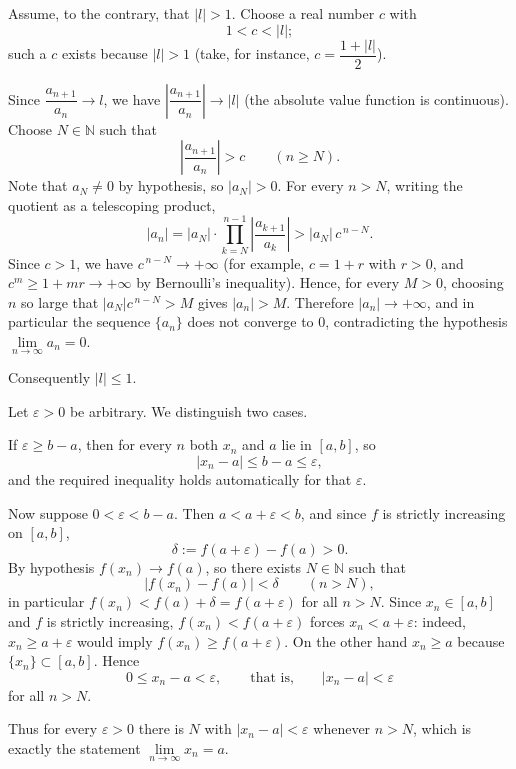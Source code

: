 \documentclass[11pt,a4paper]{article}
\newenvironment{solution}[1]{%
  \par\addvspace{1.7ex}%
  \noindent{\color{solutioncolor}\textbf{#1}}\hspace{0.55em}\ignorespaces}%
  {\par\addvspace{0.9ex}}
\begin{document}
\begin{solution}{Solution 2.1.15}\label{xs:2.1.15}
Assume, to the contrary, that $|l|>1$. Choose a real number $c$ with
\[
1<c<|l|;
\]
such a $c$ exists because $|l|>1$ (take, for instance, $c=\dfrac{1+|l|}{2}$).

Since $\dfrac{a_{n+1}}{a_n}\to l$, we have $\left|\dfrac{a_{n+1}}{a_n}\right|\to |l|$ (the absolute value function is continuous). Choose $N\in\mathbb{N}$ such that
\[
\left|\frac{a_{n+1}}{a_n}\right|>c\qquad(n\ge N).
\]
Note that $a_N\ne 0$ by hypothesis, so $|a_N|>0$. For every $n>N$, writing the quotient as a telescoping product,
\[
|a_n|=|a_N|\cdot\prod_{k=N}^{n-1}\left|\frac{a_{k+1}}{a_k}\right|>|a_N|\,c^{\,n-N}.
\]
Since $c>1$, we have $c^{\,n-N}\to+\infty$ (for example, $c=1+r$ with $r>0$, and $c^m\ge 1+mr\to+\infty$ by Bernoulli's inequality). Hence, for every $M>0$, choosing $n$ so large that $|a_N|c^{\,n-N}>M$ gives $|a_n|>M$. Therefore $|a_n|\to+\infty$, and in particular the sequence $\{a_n\}$ does not converge to $0$, contradicting the hypothesis $\lim\limits_{n\to\infty}a_n=0$.

Consequently $|l|\le 1$.
\end{solution}

\begin{solution}{Solution 2.1.16}\label{xs:2.1.16}
Let $\varepsilon>0$ be arbitrary. We distinguish two cases.

If $\varepsilon\ge b-a$, then for every $n$ both $x_n$ and $a$ lie in $[a,b]$, so
\[
|x_n-a|\le b-a\le\varepsilon ,
\]
and the required inequality holds automatically for that $\varepsilon$.

Now suppose $0<\varepsilon<b-a$. Then $a<a+\varepsilon<b$, and since $f$ is strictly increasing on $[a,b]$,
\[
\delta:=f(a+\varepsilon)-f(a)>0 .
\]
By hypothesis $f(x_n)\to f(a)$, so there exists $N\in\mathbb{N}$ such that
\[
|f(x_n)-f(a)|<\delta\qquad(n>N),
\]
in particular $f(x_n)<f(a)+\delta=f(a+\varepsilon)$ for all $n>N$. Since $x_n\in[a,b]$ and $f$ is strictly increasing, $f(x_n)<f(a+\varepsilon)$ forces $x_n<a+\varepsilon$: indeed, $x_n\ge a+\varepsilon$ would imply $f(x_n)\ge f(a+\varepsilon)$. On the other hand $x_n\ge a$ because $\{x_n\}\subset[a,b]$. Hence
\[
0\le x_n-a<\varepsilon,\qquad\text{that is,}\qquad |x_n-a|<\varepsilon
\]
for all $n>N$.

Thus for every $\varepsilon>0$ there is $N$ with $|x_n-a|<\varepsilon$ whenever $n>N$, which is exactly the statement $\lim\limits_{n\to\infty}x_n=a$.
\end{solution}
\end{document}
